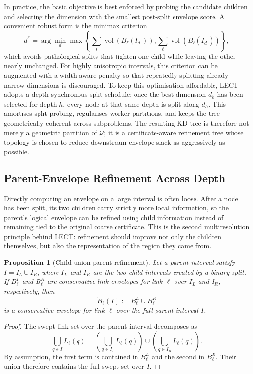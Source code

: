 \documentclass[journal]{IEEEtran}
\newtheorem{proposition}{Proposition}
\newcommand{\Q}{\ensuremath{\mathcal{Q}}}
\begin{document}
In practice, the basic objective is best enforced by probing the candidate
children and selecting the dimension with the smallest post-split envelope
score. A convenient robust form is the minimax criterion
\[
d^* = \arg\min_d
\max\!\left\{\sum_{\ell}\operatorname{vol}(B_\ell(I_d^-)),
\sum_{\ell}\operatorname{vol}(B_\ell(I_d^+))\right\},
\]
which avoids pathological splits that tighten one child while leaving the other
nearly unchanged. For highly anisotropic intervals, this criterion can be
augmented with a width-aware penalty so that repeatedly splitting already
narrow dimensions is discouraged. To keep this optimisation affordable, LECT
adopts a depth-synchronous split schedule: once the best dimension $d_h$ has
been selected for depth $h$, every node at that same depth is split along
$d_h$. This amortises split probing, regularises worker partitions, and keeps
the tree geometrically coherent across subproblems. The resulting KD tree is
therefore not merely a geometric
partition of $\Q$; it is a certificate-aware refinement tree whose topology is
chosen to reduce downstream envelope slack as aggressively as possible.

\subsection{Parent-Envelope Refinement Across Depth}
\label{sec:lect_parent_refine}

Directly computing an envelope on a large interval is often loose. After a node
has been split, its two children carry strictly more local information, so the
parent's logical envelope can be refined using child information instead of
remaining tied to the original coarse certificate. This is the second
multiresolution principle behind LECT: refinement should improve not only the
children themselves, but also the representation of the region they came from.

\begin{proposition}[Child-union parent refinement]
\label{prop:parent_union}
Let a parent interval satisfy $I = I_L \cup I_R$, where $I_L$ and $I_R$ are the
two child intervals created by a binary split. If $B_\ell^L$ and $B_\ell^R$ are
conservative link envelopes for link $\ell$ over $I_L$ and $I_R$, respectively,
then
\[
\widetilde{B}_\ell(I) := B_\ell^L \cup B_\ell^R
\]
is a conservative envelope for link $\ell$ over the full parent interval $I$.
\end{proposition}

\begin{proof}
The swept link set over the parent interval decomposes as
\[
\bigcup_{q\in I} L_\ell(q)
= \left(\bigcup_{q\in I_L} L_\ell(q)\right)
\cup
\left(\bigcup_{q\in I_R} L_\ell(q)\right).
\]
By assumption, the first term is contained in $B_\ell^L$ and the second in
$B_\ell^R$. Their union therefore contains the full swept set over $I$.
\end{proof}
\end{document}

